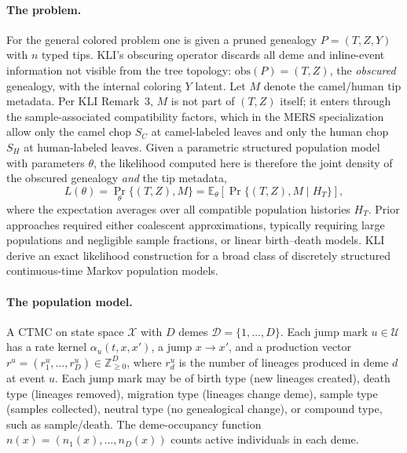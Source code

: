 \documentclass[11pt]{article}
\newcommand{\Z}{\mathbb{Z}}
\newcommand{\E}{\mathbb{E}}
\theoremstyle{plain}
\begin{document}
\paragraph{The problem.} For the general colored problem one is given a pruned genealogy $P=(T,Z,Y)$
with $n$ typed tips. KLI's obscuring operator discards all deme and inline-event information not
visible from the tree topology: $\mathrm{obs}(P)=(T,Z)$, the \emph{obscured} genealogy, with the
internal coloring $Y$ latent. Let $M$ denote the camel/human tip metadata. Per KLI Remark~3, $M$ is
not part of $(T,Z)$ itself; it enters through the sample-associated compatibility factors, which in
the MERS specialization allow only the camel chop $S_C$ at camel-labeled leaves and only the human
chop $S_H$ at human-labeled leaves. Given a parametric structured population model with
parameters $\theta$, the likelihood computed here is therefore the joint density of the obscured
genealogy \emph{and} the tip metadata,
\[
L(\theta)=\Pr_\theta\{(T,Z),M\}
=\E_\theta\!\left[\Pr\{(T,Z),M\mid H_T\}\right],
\]
where the expectation averages over all compatible population histories $H_T$. Prior approaches
required either coalescent approximations, typically requiring large populations and negligible sample fractions, or linear birth--death models. KLI derive an exact likelihood construction for a broad class of discretely structured continuous-time Markov population models.

\paragraph{The population model.} A CTMC on state space $\mathcal X$ with $D$ demes
$\mathcal D=\{1,\dots,D\}$. Each jump mark $u\in\mathcal U$ has a rate kernel $\alpha_u(t,x,x')$, a
jump $x\to x'$, and a production vector $r^u=(r^u_1,\dots,r^u_D)\in\Z^D_{\ge0}$, where $r^u_d$ is the
number of lineages produced in deme $d$ at event $u$. Each jump mark may be of birth type (new lineages created), death type (lineages removed), migration type (lineages change deme), sample type (samples collected), neutral type (no genealogical change), or compound type, such as sample/death.
The deme-occupancy function $n(x)=(n_1(x),\dots,n_D(x))$ counts active individuals in each deme.
\end{document}
